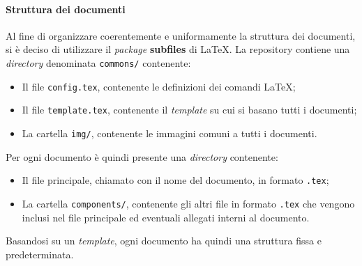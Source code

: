 \documentclass[../norme-di-progetto.tex]{subfiles}
\begin{document}
\paragraph{Struttura dei documenti}
Al fine di organizzare coerentemente e uniformamente la struttura dei documenti, si è deciso di utilizzare il \textit{package} \textbf{subfiles} di \LaTeX. La repository contiene una \textit{directory} denominata \texttt{commons/} contenente:
\begin{itemize}
  \item Il file \texttt{config.tex}, contenente le definizioni dei comandi \LaTeX;
  \item Il file \texttt{template.tex}, contenente il \textit{template} su cui si basano tutti i documenti;
  \item La cartella \texttt{img/}, contenente le immagini comuni a tutti i documenti.
\end{itemize}
Per ogni documento è quindi presente una \textit{directory} contenente:
\begin{itemize}
  \item  Il file principale, chiamato con il nome del documento, in formato \texttt{.tex};
  \item La cartella \texttt{components/}, contenente gli altri file in formato \texttt{.tex} che vengono inclusi nel file principale ed eventuali allegati interni al documento.
\end{itemize}
Basandosi su un \textit{template}, ogni documento ha quindi una struttura fissa e predeterminata.
\end{document}
